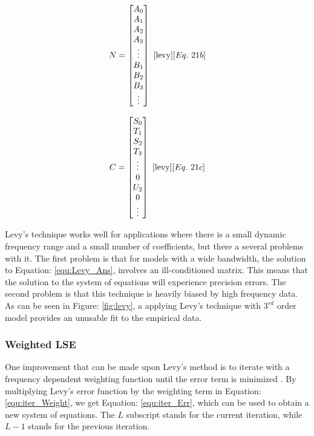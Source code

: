 \begin{multicols}{2}
    \begin{equation}
        \label{equ:Levy_N}
        N = 
        \begin{bmatrix}
            A_0 \\
            A_1 \\
            A_2 \\
            A_3 \\
            \vdots \\
            B_1 \\
            B_2 \\
            B_3 \\
            \vdots
        \end{bmatrix}
        ~\cite{levy}[Eq.~21b]
    \end{equation}

    \begin{equation}
        \label{equ:Levy_C}
        C = 
        \begin{bmatrix}
            S_0 \\
            T_1 \\
            S_2 \\
            T_3 \\
            \vdots \\
            0   \\
            U_2 \\
            0   \\
            \vdots
        \end{bmatrix}
        ~\cite{levy}[Eq.~21c]
    \end{equation}
\end{multicols}

Levy's technique works well for applications where there is a small dynamic frequency range and a small number of coefficients, but there a several problems with it.
The first problem is that for models with a wide bandwidth, the solution to Equation: \eqref{equ:Levy_Ans}, involves an ill-conditioned matrix. This means that the solution to the system of equations will experience precision errors.
The second problem is that this technique is heavily biased by high frequency data. As can be seen in Figure: \ref{fig:levy}, a applying Levy's technique with $3^{rd}$ order model provides an unusable fit to the empirical data.



\subsubsection{Weighted LSE}
\label{sec:weightedLSE}
One improvement that can be made upon Levy's method is to iterate with a frequency dependent weighting function until the error term is minimized \cite{levy_iter}. By multiplying Levy's error function by the weighting term in Equation: \eqref{equ:iter_Weight}, we get Equation: \eqref{equ:iter_Err}, which can be used to obtain a new system of equations.
The $L$ subscript stands for the current iteration, while $L-1$ stands for the previous iteration.

